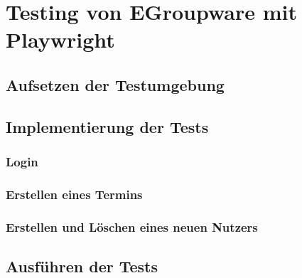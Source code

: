 \chapter{Testing von EGroupware mit Playwright}

\section{Aufsetzen der Testumgebung}

\section{Implementierung der Tests}

\subsection{Login}

\subsection{Erstellen eines Termins}

\subsection{Erstellen und Löschen eines neuen Nutzers}

\section{Ausführen der Tests}

